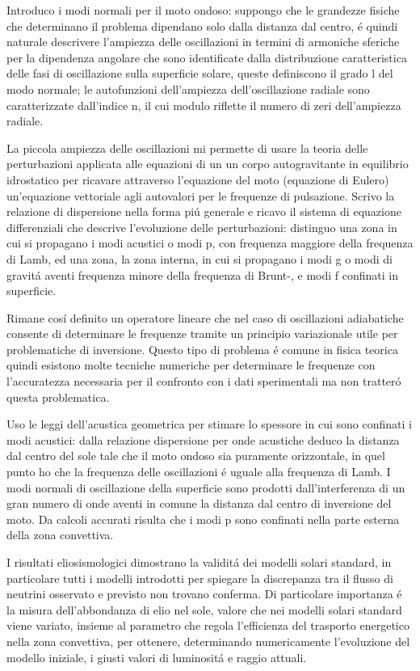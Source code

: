 \documentclass[../main.tex]{subfiles}
\begin{document}
Introduco i modi normali per il moto ondoso: suppongo che le grandezze fisiche che determinano il problema dipendano solo dalla distanza dal centro, \'e quindi naturale descrivere l'ampiezza delle oscillazioni  in termini di armoniche sferiche per la dipendenza angolare che sono identificate dalla distribuzione caratteristica delle fasi di oscillazione sulla superficie solare, queste definiscono il grado l del modo normale; le autofunzioni dell'ampiezza dell'oscillazione radiale sono caratterizzate dall'indice n, il cui modulo riflette il numero di zeri dell'ampiezza radiale.


La piccola ampiezza delle oscillazioni mi permette di usare la teoria delle perturbazioni applicata alle equazioni di un un corpo autogravitante in equilibrio idrostatico per ricavare attraverso l'equazione del moto (equazione di Eulero) un'equazione vettoriale agli autovalori per le frequenze di pulsazione. 
Scrivo la relazione di dispersione nella forma pi\'u generale e ricavo il sistema di equazione differenziali che descrive l'evoluzione delle perturbazioni: distinguo una zona in cui si propagano i modi acustici o modi p, con frequenza maggiore della frequenza di Lamb, ed una zona, la zona interna, in cui si propagano i modi g o modi di gravit\'a aventi frequenza minore della frequenza di Brunt-\vai{}, e modi f confinati in superficie. 

Rimane cos\'i definito un operatore lineare che nel caso di oscillazioni adiabatiche consente di determinare le frequenze tramite un principio variazionale utile per problematiche di inversione. Questo tipo di problema \'e comune in fisica teorica quindi esistono molte tecniche numeriche per determinare le frequenze con l'accuratezza necessaria per il confronto con i dati sperimentali ma non tratter\'o questa problematica.

Uso le leggi dell'acustica geometrica per stimare lo spessore in cui sono confinati i modi acustici: dalla relazione dispersione per onde acustiche deduco la distanza dal centro del sole tale che il moto ondoso sia puramente orizzontale, in quel punto ho che la frequenza delle oscillazioni \'e uguale alla frequenza di Lamb. I modi normali di oscillazione della superficie sono prodotti dall'interferenza di un gran numero di onde aventi in comune la distanza dal centro di inversione del moto. Da calcoli accurati risulta che i modi p sono confinati nella parte esterna della zona convettiva. 

I risultati eliosismologici dimostrano la validit\'a dei modelli solari standard, in particolare tutti i modelli introdotti per spiegare la discrepanza tra il flusso di neutrini osservato e previsto non trovano conferma. Di particolare importanza \'e la  misura  dell'abbondanza di elio nel sole, valore che nei modelli solari standard viene variato, insieme al parametro che regola l'efficienza del trasporto energetico nella zona convettiva, per ottenere, determinando numericamente l'evoluzione del modello iniziale, i giusti valori di luminosit\'a e raggio attuali.
\end{document}
